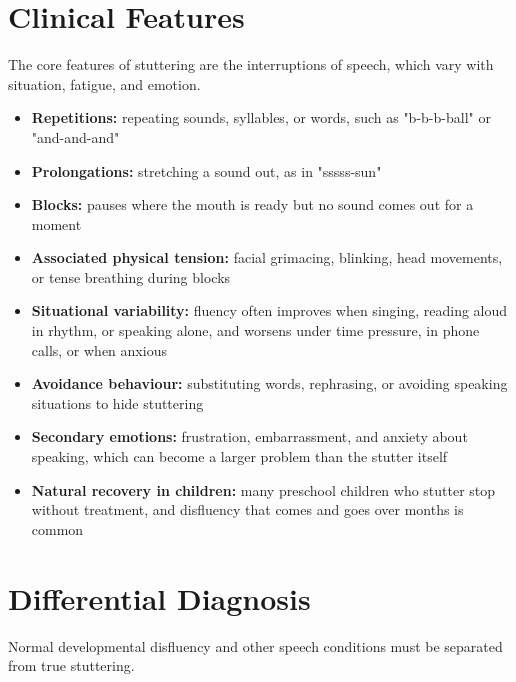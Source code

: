 \section*{Clinical Features}
The core features of stuttering are the interruptions of speech, which vary with situation, fatigue, and emotion.

\begin{itemize}
    \item \textbf{Repetitions:} repeating sounds, syllables, or words, such as "b-b-b-ball" or "and-and-and"
    \item \textbf{Prolongations:} stretching a sound out, as in "sssss-sun"
    \item \textbf{Blocks:} pauses where the mouth is ready but no sound comes out for a moment
    \item \textbf{Associated physical tension:} facial grimacing, blinking, head movements, or tense breathing during blocks
    \item \textbf{Situational variability:} fluency often improves when singing, reading aloud in rhythm, or speaking alone, and worsens under time pressure, in phone calls, or when anxious
    \item \textbf{Avoidance behaviour:} substituting words, rephrasing, or avoiding speaking situations to hide stuttering
    \item \textbf{Secondary emotions:} frustration, embarrassment, and anxiety about speaking, which can become a larger problem than the stutter itself
    \item \textbf{Natural recovery in children:} many preschool children who stutter stop without treatment, and disfluency that comes and goes over months is common
\end{itemize}

\section*{Differential Diagnosis}
Normal developmental disfluency and other speech conditions must be separated from true stuttering.

